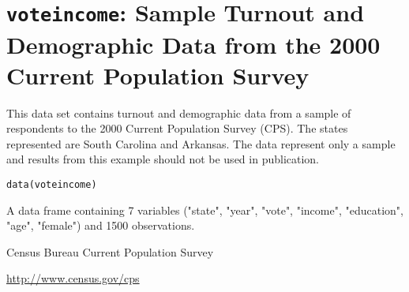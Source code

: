  \section{{\tt voteincome}: Sample Turnout and Demographic Data from the 2000 Current Population Survey}\label{ss:voteincome}
\begin{Description}\relax
This data set contains turnout and demographic data from a sample of respondents to the 2000 Current Population Survey (CPS). The states represented are South Carolina and Arkansas. The data represent only a sample and results from this example should not be used in publication.
\end{Description}
\begin{Usage}
\begin{verbatim}data(voteincome)\end{verbatim}
\end{Usage}
\begin{Format}\relax
A data frame containing 7 variables ("state", "year", "vote", "income", "education", "age", "female") and 1500 observations.  
\end{Format}
\begin{Source}\relax
Census Bureau Current Population Survey
\end{Source}
\begin{References}\relax
\url{http://www.census.gov/cps}
\end{References}


